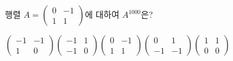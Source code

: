 \hspace*{2mm}\begin{minipage}[t]{\dimexpr\linewidth-2mm\relax}\vspace{0pt}
행렬 $A=\begin{pmatrix} 0 & -1 \\ 1 & 1 \end{pmatrix}$에 대하여 $A^{1000}$은?
\begin{choices32}{$\begin{pmatrix} -1 & -1 \\ 1 & 0 \end{pmatrix}$}{$\begin{pmatrix} -1 & 1 \\ -1 & 0 \end{pmatrix}$}{$\begin{pmatrix} 0 & -1 \\ 1 & 1 \end{pmatrix}$}{$\begin{pmatrix} 0 & 1 \\ -1 & -1 \end{pmatrix}$}{$\begin{pmatrix} 1 & 1 \\ 0 & 0 \end{pmatrix}$}\end{choices32}\end{minipage}
